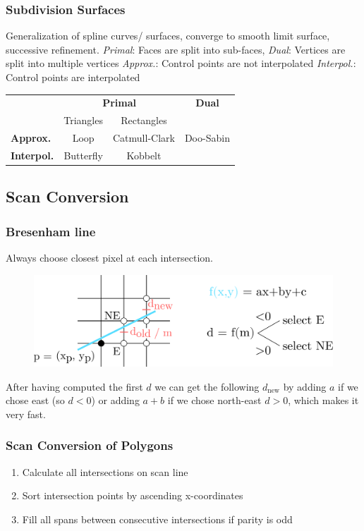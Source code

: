 \documentclass[a4paper,10pt]{article}
\renewcommand*{\arraystretch}{2}
\begin{document}
\subsubsection{Subdivision Surfaces} Generalization of spline curves/ surfaces, converge to smooth limit surface, successive refinement.
\textit{Primal}: Faces are split into sub-faces,
\textit{Dual}: Vertices are split into multiple vertices
\textit{Approx.}: Control points are not interpolated
\textit{Interpol.}: Control points are interpolated

\begin{center}
    \renewcommand{\arraystretch}{1.2}
\begin{tabularx}{\linewidth}{Xccc}
    \toprule
    & \multicolumn{2}{c}{\textbf{Primal}} & \textbf{Dual} \\
    & Triangles & Rectangles & \\
    \midrule
    \textbf{Approx.} & Loop & Catmull-Clark & Doo-Sabin \\
    \textbf{Interpol.} & Butterfly & Kobbelt & \\
    \bottomrule
\end{tabularx}
\end{center}

\subsection{Scan Conversion}
\subsubsection{Bresenham line} Always choose closest pixel at each intersection. 
\begin{figure}[h]
    \center
    \includegraphics[width=0.75\linewidth]{bresenham-line.png}
\end{figure}

After having computed the first \( d \) we can get the following \( d_\text{new} \) by adding \( a \) if we chose east (so \( d < 0 \)) or adding \( a + b \) if we chose north-east \( d > 0 \), which makes it very fast.

\subsubsection{Scan Conversion of Polygons} 
\begin{enumerate}
    \item Calculate all intersections on scan line
    \item Sort intersection points by ascending x-coordinates
    \item Fill all spans between consecutive intersections if parity is odd
\end{enumerate}
\end{document}
